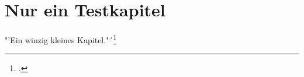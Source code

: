 \chapter{Nur ein Testkapitel}

"'Ein winzig kleines Kapitel."´\footcite[70]{schlosser_wissenschaftliche_2009}
